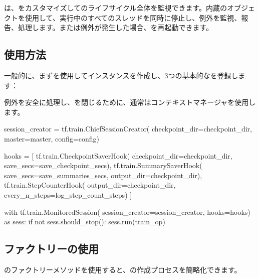 \begin{content}

は、をカスタマイズしてのライフサイクル全体を監視できます。内蔵のオブジェクトを使用して、実行中のすべてのスレッドを同時に停止し、例外を監視、報告、処理します。または例外が発生した場合、を再起動できます。

\subsection{使用方法}

一般的に、まずを使用してインスタンスを作成し、3つの基本的なを登録します：

\begin{enum}
\end{enum}

例外を安全に処理し、を閉じるために、通常はコンテキストマネージャを使用します。

\begin{leftbar}
\begin{python}
session_creator = tf.train.ChiefSessionCreator(
  checkpoint_dir=checkpoint_dir,
  master=master,
  config=config)

hooks = [
  tf.train.CheckpointSaverHook(
    checkpoint_dir=checkpoint_dir,
    save_secs=save_checkpoint_secs),
  tf.train.SummarySaverHook(
    save_secs=save_summaries_secs,
    output_dir=checkpoint_dir),
  tf.train.StepCounterHook(
    output_dir=checkpoint_dir, 
    every_n_steps=log_step_count_steps)
]

with tf.train.MonitoredSession(
  session_creator=session_creator,
  hooks=hooks) as sess:
  if not sess.should_stop():
    sess.run(train_op)
\end{python}
\end{leftbar}

\subsection{ファクトリーの使用}

のファクトリーメソッドを使用すると、の作成プロセスを簡略化できます。


\end{content}
